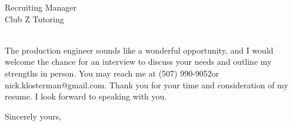 \documentclass{letter} %
\makeatletter
\newcommand{\contactperson}{Recruiting Manager}
\newcommand{\contactCompany}{Club Z Tutoring}
\newcommand{\contactStreetAddress}{ }  %
\newcommand{\contactCityStateZip}{ }
\newcommand{\position}{production engineer }%
\newcommand{\personalphonenumber}{(507) 990-9052}
\newcommand{\personalemail}{nick.klosterman@gmail.com}
\makeatother
\begin{document}
\begin{letter}{\contactperson \\
\contactCompany \\
\contactStreetAddress \\
\contactCityStateZip

}
 
\noindent 
The \position sounds like a wonderful opportunity, and I would welcome the chance for an interview to discuss your needs and outline my strengths in person. 
You may reach me at \personalphonenumber or \personalemail.
Thank you for your time and consideration of my resume. I look forward to speaking with you.
 

\closing{Sincerely yours,} 
 

 

\end{letter}
 
\end{document}
